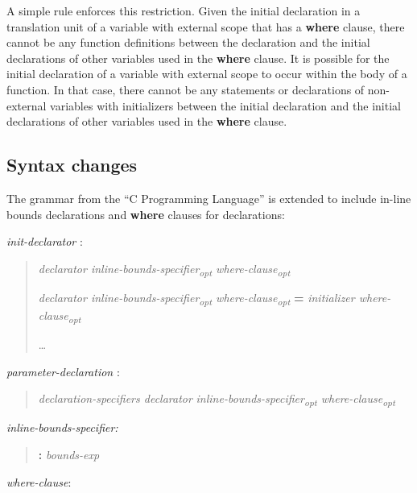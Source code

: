 \documentclass[]{article}
\begin{document}
A simple rule enforces this restriction. Given the initial declaration
in a translation unit of a variable with external scope that has a
\textbf{where} clause, there cannot be any function definitions between
the declaration and the initial declarations of other variables used in
the \textbf{where} clause. It is possible for the initial declaration of
a variable with external scope to occur within the body of a function.
In that case, there cannot be any statements or declarations of
non-external variables with initializers between the initial declaration
and the initial declarations of other variables used in the
\textbf{where} clause.

\subsection{\texorpdfstring{\protect\hypertarget{ux5fToc435434936}{}{\protect\hypertarget{ux5fToc437460757}{}{\protect\hypertarget{ux5fToc440445435}{}{\protect\hypertarget{ux5fToc440449217}{}{\protect\hypertarget{ux5fToc440551867}{}{\protect\hypertarget{ux5fToc426641072}{}{\protect\hypertarget{ux5fRef426706880}{}{}}}}}}}Syntax
changes}{Syntax changes}}\label{syntax-changes}

The grammar from the ``C Programming Language'' is extended to include
in-line bounds declarations and \textbf{where} clauses for declarations:

\emph{init-declarator} :

\begin{quote}
\emph{declarator inline-bounds-specifier\textsubscript{opt}
where-clause\textsubscript{opt}}

\emph{declarator inline-bounds-specifier\textsubscript{opt}
where-clause\textsubscript{opt}} \textbf{=} \emph{initializer
where-clause\textsubscript{opt}}

\ldots{}
\end{quote}

\emph{parameter-declaration} :

\begin{quote}
\emph{declaration-specifiers declarator}
\emph{inline-bounds-specifier\textsubscript{opt}
where-clause\textsubscript{opt}}
\end{quote}

\emph{inline-bounds-specifier:}

\begin{quote}
\textbf{:} \emph{bounds-exp}
\end{quote}

\emph{where-clause}:
\end{document}
